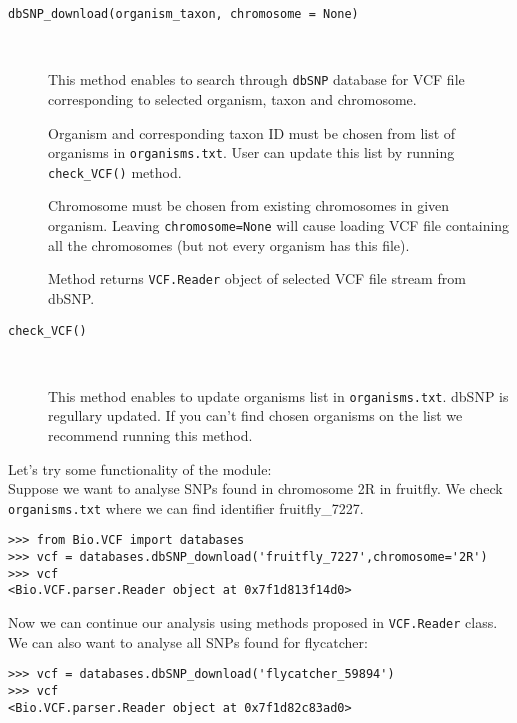 \begin{description}
  \item[\texttt{dbSNP\_download(organism\_taxon, chromosome = None)}] \

    This method enables to search through \verb|dbSNP| database for VCF file corresponding to selected
    organism, taxon and chromosome.
    
    Organism and corresponding taxon ID must be chosen from list of organisms in \verb|organisms.txt|. User can update this list by running
    \verb|check_VCF()| method.
    
    Chromosome must be chosen from existing chromosomes in given organism. Leaving \verb|chromosome=None| will cause loading VCF file
    containing all the chromosomes (but not every organism has this file).
    
    Method returns \verb|VCF.Reader| object of selected VCF file stream from dbSNP.
    
    \item[\texttt{check\_VCF()}] \
    
    This method enables to update organisms list in \verb|organisms.txt|. dbSNP is regullary updated. If you can't find chosen organisms on 
    the list we recommend running this method. 

\end{description}

\noindent Let's try some functionality of the module:\\

\noindent Suppose we want to analyse SNPs found in chromosome 2R in fruitfly. We check \verb|organisms.txt| where we can find identifier 
fruitfly\_7227.

\begin{verbatim}
>>> from Bio.VCF import databases
>>> vcf = databases.dbSNP_download('fruitfly_7227',chromosome='2R')
>>> vcf
<Bio.VCF.parser.Reader object at 0x7f1d813f14d0>
\end{verbatim}

\noindent Now we can continue our analysis using methods proposed in \verb|VCF.Reader| class.\\

\noindent We can also want to analyse all SNPs found for flycatcher:

\begin{verbatim}
>>> vcf = databases.dbSNP_download('flycatcher_59894')
>>> vcf
<Bio.VCF.parser.Reader object at 0x7f1d82c83ad0>
\end{verbatim}

